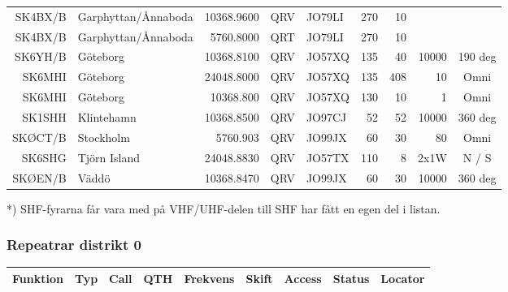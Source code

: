 \begin{landscape}
\begin{tabular}{rlrllrrrc}
SK4BX/B & Garphyttan/Ånnaboda & 10368.9600 & QRV & JO79LI & 270 & 10  &       &         \\
SK4BX/B & Garphyttan/Ånnaboda & 5760.8000  & QRT & JO79LI & 270 & 10  &       &         \\
SK6YH/B & Göteborg            & 10368.8100 & QRV & JO57XQ & 135 & 40  & 10000 & 190 deg \\
SK6MHI  & Göteborg            & 24048.8000 & QRV & JO57XQ & 135 & 408 & 10    & Omni    \\
SK6MHI  & Göteborg            & 10368.800  & QRV & JO57XQ & 130 & 10  & 1     & Omni    \\
SK1SHH  & Klintehamn          & 10368.8500 & QRV & JO97CJ & 52  & 52  & 10000 & 360 deg \\
SKØCT/B & Stockholm           & 5760.903   & QRV & JO99JX & 60  & 30  & 80    & Omni    \\
SK6SHG  & Tjörn Island        & 24048.8830 & QRV & JO57TX & 110 & 8   & 2x1W  & N / S   \\
SKØEN/B & Väddö               & 10368.8470 & QRV & JO99JX & 60  & 30  & 10000 & 360 deg \\

\end{tabular}

*) SHF-fyrarna får vara med på VHF/UHF-delen till SHF har fått en egen del i listan.

\clearpage


\subsubsection{Repeatrar distrikt 0}
\footnotesize
\begin{longtable}{llllrrlcl}
	\textbf{Funktion} & \textbf{Typ} & \textbf{Call} & \textbf{QTH} & \textbf{Frekvens} & \textbf{Skift} & \textbf{Access} & \textbf{Status} & \textbf{Locator} \\ \hline \endhead


\end{longtable}
\end{landscape}
